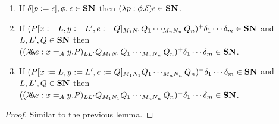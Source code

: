 
\begin{lemma}
\label{lm:SNothers}
$ $
\begin{enumerate}
\item
If $\delta[p:=\epsilon], \phi, \epsilon \in \mathbf{SN}$ then $(\lambda p:\phi.\delta)\epsilon \in \mathbf{SN}$.
\item
If $(P[x:=L, y:=L', e:=Q]_{M_1 N_1} Q_1 \cdots_{M_n N_n} Q_n)^+ \delta_1 \cdots \delta_m \in \mathbf{SN}$ and $L, L', Q \in \mathbf{SN}$ then $((\lambda \!\! \lambda \!\! \lambda e:x =_A y.P)_{L L'} Q_{M_1 N_1} Q_1 \cdots_{M_n N_n} Q_n)^+ \delta_1 \cdots \delta_m \in \mathbf{SN}$.
\item
If $(P[x:=L, y:=L', e:=Q]_{M_1 N_1} Q_1 \cdots_{M_n N_n} Q_n)^- \delta_1 \cdots \delta_m \in \mathbf{SN}$ and $L, L', Q \in \mathbf{SN}$ then $((\lambda \!\! \lambda \!\! \lambda e:x =_A y.P)_{L L'} Q_{M_1 N_1} Q_1 \cdots_{M_n N_n} Q_n)^- \delta_1 \cdots \delta_m \in \mathbf{SN}$.
\end{enumerate}
\end{lemma}

\begin{proof}
Similar to the previous lemma.
\end{proof}




